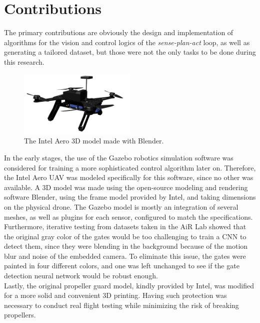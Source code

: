 \section{Contributions}

The primary contributions are obviously the design and implementation of
algorithms for the vision and control logics of the \emph{sense-plan-act} loop,
as well as generating a tailored dataset, but those were not the only tasks to
be done during this research.

\begin{figure}[h!]
	\centering
	\includegraphics[width=0.5\textwidth]{figure/aero.png}
	\caption{The Intel Aero 3D model made with Blender.}
	\label{fig:aero}
\end{figure}

In the early stages, the use of the Gazebo robotics simulation software was
considered for training a more sophisticated control algorithm later on.
Therefore, the Intel Aero UAV was modeled specifically for this software,
since no other was available. A 3D model was made using the open-source
modeling and rendering software Blender, using the frame model provided by
Intel, and taking dimensions on the physical drone. The Gazebo model is mostly
an integration of several meshes, as well as plugins for each sensor, configured
to match the specifications.
Furthermore, iterative testing from datasets taken in the AiR Lab showed that
the original gray color of the gates would be too challenging to train a CNN to
detect them, since they were blending in the background because of the motion
blur and noise of the embedded camera. To eliminate this issue, the gates were
painted in four different colors, and one was left unchanged to see if the gate
detection neural network would be robust enough.\\

Lastly, the original propeller guard model, kindly provided by Intel, was
modified for a more solid and convenient 3D printing. Having such protection was
necessary to conduct real flight testing while minimizing the risk of breaking
propellers.
